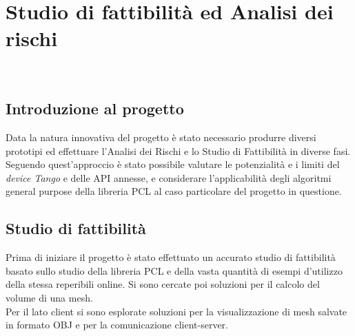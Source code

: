 
\chapter{Studio di fattibilità ed Analisi dei rischi}
\label{cap:descrizione-stage}

\\

\section{Introduzione al progetto}

Data la natura innovativa del progetto è stato necessario produrre diversi prototipi ed
effettuare l’Analisi dei Rischi e lo Studio di Fattibilità in diverse fasi.
Seguendo quest'approccio è stato possibile valutare le potenzialità e i limiti del \emph{device Tango} e delle API annesse, e considerare l'applicabilità degli algoritmi general purpose della libreria PCL al caso particolare del progetto in questione.

\section{Studio di fattibilità}
Prima di iniziare il progetto è stato effettuato un accurato studio di fattibilità basato sullo studio della libreria PCL e della vasta quantità di esempi d'utilizzo della stessa reperibili online. Si sono cercate poi soluzioni per il calcolo del volume di una mesh.\\
Per il lato client si sono esplorate soluzioni per la visualizzazione di mesh salvate in formato OBJ e per la comunicazione client-server.


